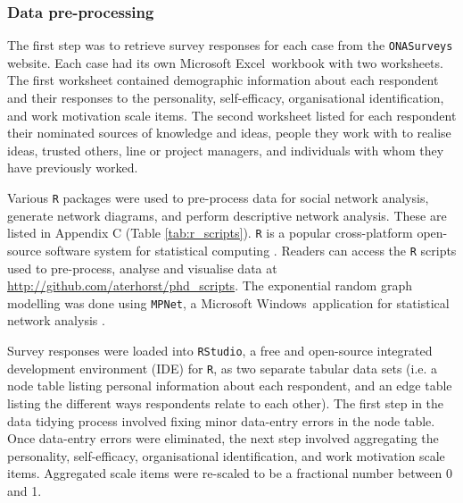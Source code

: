 \subsubsection{Data pre-processing}

The first step was to retrieve survey responses for each case from the \texttt{ONASurveys} website. Each case had its own Microsoft Excel\texttrademark\ workbook with two worksheets. The first worksheet contained demographic information about each respondent and their responses to the personality, self-efficacy, organisational identification, and work motivation scale items. The second worksheet listed for each respondent their nominated sources of knowledge and ideas, people they work with to realise ideas, trusted others, line or project managers, and individuals with whom they have previously worked. \medskip

Various \texttt{R} packages were used to pre-process data for social network analysis, generate network diagrams, and perform descriptive network analysis. These are listed in Appendix C (Table \ref{tab:r_scripts}). \texttt{R} is a popular cross-platform open-source software system for statistical computing \citep{core2018r}. Readers can access the \texttt{R} scripts used to pre-process, analyse and visualise data at \url{http://github.com/aterhorst/phd_scripts}. The exponential random graph modelling was done using \texttt{MPNet}, a Microsoft Windows\texttrademark\ application for statistical network analysis \citep{wang2014mpnet}. \medskip

Survey responses were loaded into \texttt{RStudio}, a free and open-source integrated development environment (IDE) for \texttt{R}, as two separate tabular data sets (i.e. a node table listing personal information about each respondent, and an edge table listing the different ways respondents relate to each other). The first step in the data tidying process involved fixing minor data-entry errors in the node table. Once data-entry errors were eliminated, the next step involved aggregating the personality, self-efficacy, organisational identification, and work motivation scale items. Aggregated scale items were re-scaled to be a fractional number between 0 and 1. \medskip

